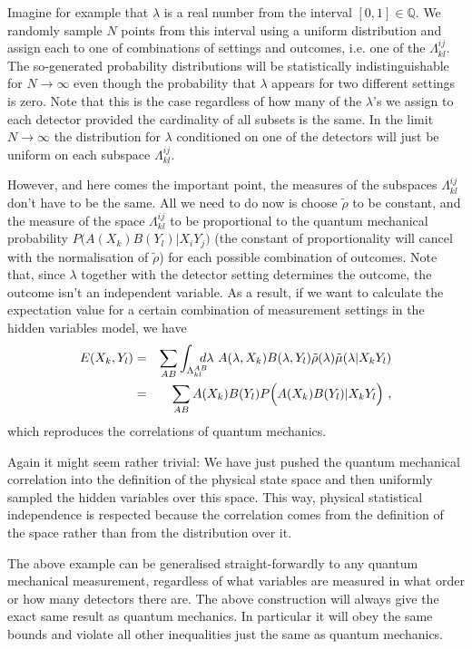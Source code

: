 \documentclass{article}
\begin{document}
Imagine for example that $\lambda$ is a real number from the interval $[0,1] \in {\mathbb{Q}}$. We randomly sample $N$ points from this interval using a uniform distribution and assign each to one of combinations of settings and outcomes, i.e. one of the $\Lambda^{ij}_{kl}$. The so-generated probability distributions will be statistically indistinguishable for $N\to \infty$ even though the probability that $\lambda$ appears for two different settings is zero. Note that this is the case regardless of how many of the $\lambda$'s we assign to each detector provided the cardinality of all subsets is the same. In the limit $N\to \infty$ the distribution for $\lambda$ conditioned on one of the detectors will just be uniform on each subspace $\Lambda^{ij}_{kl}$.

However, and here comes the important point, the measures of the subspaces $\Lambda^{ij}_{kl}$ don't have to be the same. All we need to do now is choose $\tilde \rho$ to be constant, and the measure of the space $\Lambda^{ij}_{kl}$ to be proportional to the quantum mechanical probability $P\Big(A(X_k)B(Y_l)|X_i Y_j\Big)$ (the constant of proportionality will cancel with the normalisation of $\tilde \rho$) for each possible combination of outcomes. Note that, since $\lambda$ together with the detector setting determines the outcome, the outcome isn't an independent variable. As a result, if we want to calculate the expectation value for a certain combination of measurement settings in the hidden variables model, we have
\begin{eqnarray}
E(X_k,Y_l) &=& 
\sum_{AB} \int_{\Lambda^{AB}_{kl}} \hspace*{-0.3cm} d \lambda~ A(\lambda,X_k) B(\lambda,Y_l) \tilde \rho(\lambda) \tilde \mu(\lambda | X_kY_l) \nonumber \\
&=& \sum_{AB} A(X_k) B(Y_l) P\Big(A(X_k)B(Y_l)|X_k Y_l\Big) ~,
\end{eqnarray}
which reproduces the correlations of quantum mechanics.

Again it might seem rather trivial: We have just pushed the quantum mechanical correlation into the definition of the physical state space and then uniformly sampled the hidden variables over this space. This way, physical statistical independence is respected because the correlation comes from the definition of the space rather than from the distribution over it.

The above example can be generalised straight-forwardly to any quantum mechanical measurement, regardless of what variables are measured in what order or how many detectors there are. The above construction will always give the exact same result as quantum mechanics. In particular it will obey the same bounds and violate all other inequalities just the same as quantum mechanics. 
\end{document}

